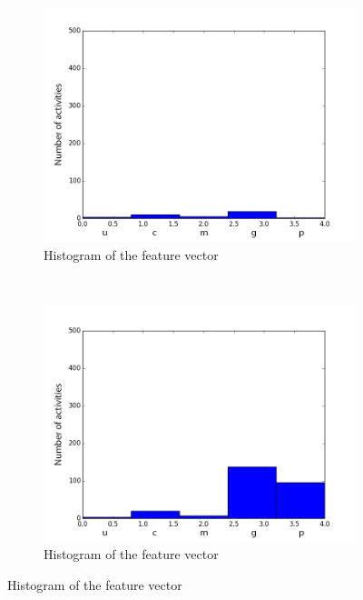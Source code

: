 \documentclass[11pt, oneside]{article}   	%
\begin{document}
\begin{figure}[!htb]
        \centering
        \begin{subfigure}[b]{0.45\textwidth}
                \includegraphics[width=\textwidth]{./hist1.png}
                \caption{Histogram of the feature vector}
                \label{hist1}
        \end{subfigure}
        ~ %
        \begin{subfigure}[b]{0.45\textwidth}
                \includegraphics[width=\textwidth]{./hist2.png}
                \caption{Histogram of the feature vector}

\end{subfigure}
\end{figure}
\end{document}
